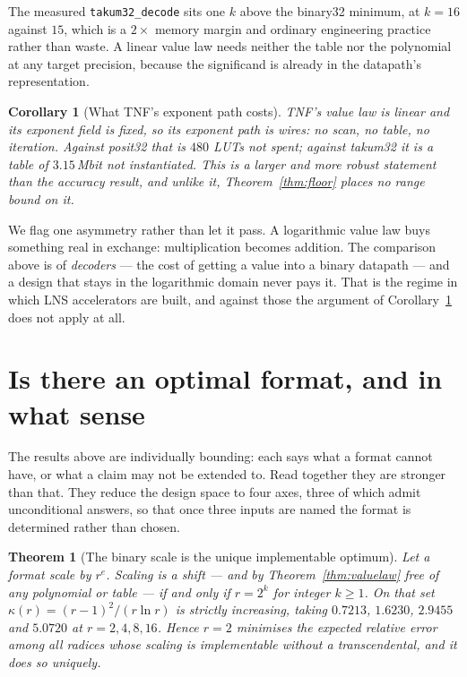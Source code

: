 \documentclass[11pt]{article}
\newtheorem{theorem}{Theorem}
\newtheorem{corollary}{Corollary}
\theoremstyle{definition}
\begin{document}
The measured \texttt{takum32\_decode} sits one $k$ above the binary32 minimum, at
$k = 16$ against $15$, which is a $2\times$ memory margin and ordinary engineering
practice rather than waste. A linear value law needs neither the table nor the
polynomial at any target precision, because the significand is already in the
datapath's representation.

\begin{corollary}[What TNF's exponent path costs]
\label{cor:zeropath}
TNF's value law is linear and its exponent field is fixed, so its exponent path
is wires: no scan, no table, no iteration. Against posit32 that is $480$ LUTs not
spent; against takum32 it is a table of $3.15$\,Mbit not instantiated. This is a
larger and more robust statement than the accuracy result, and unlike it,
Theorem~\ref{thm:floor} places no range bound on it.
\end{corollary}

We flag one asymmetry rather than let it pass. A logarithmic value law buys
something real in exchange: multiplication becomes addition. The comparison above
is of \emph{decoders} --- the cost of getting a value into a binary datapath ---
and a design that stays in the logarithmic domain never pays it. That is the
regime in which LNS accelerators are built, and against those the argument of
Corollary~\ref{cor:zeropath} does not apply at all.


\section{Is there an optimal format, and in what sense}
\label{sec:optimal}

The results above are individually bounding: each says what a format cannot have,
or what a claim may not be extended to. Read together they are stronger than that.
They reduce the design space to four axes, three of which admit unconditional
answers, so that once three inputs are named the format is determined rather than
chosen.

\begin{theorem}[The binary scale is the unique implementable optimum]
\label{thm:radixopt}
Let a format scale by $r^{e}$. Scaling is a shift --- and by
Theorem~\ref{thm:valuelaw} free of any polynomial or table --- if and only if
$r = 2^{k}$ for integer $k \geq 1$. On that set $\kappa(r) = (r-1)^2/(r\ln r)$ is
strictly increasing, taking $0.7213$, $1.6230$, $2.9455$ and $5.0720$ at
$r = 2, 4, 8, 16$. Hence $r = 2$ minimises the expected relative error among all
radices whose scaling is implementable without a transcendental, and it does so
uniquely.
\end{theorem}
\end{document}
